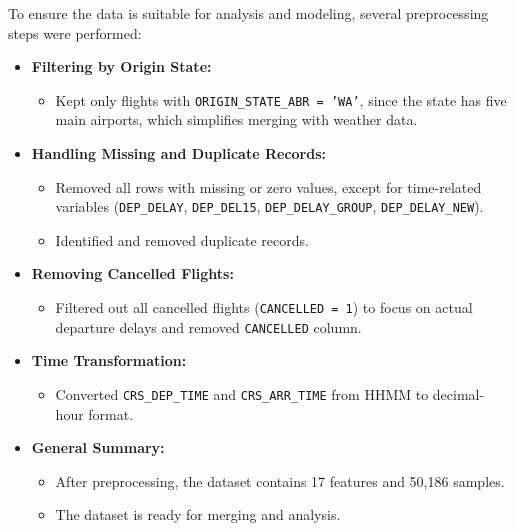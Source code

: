 \documentclass[a4paper,12pt]{report}
\begin{document}
To ensure the data is suitable for analysis and modeling, several preprocessing steps were performed:

\begin{itemize}
    \item \textbf{Filtering by Origin State:}
    \begin{itemize}
        \item Kept only flights with \texttt{ORIGIN\_STATE\_ABR = 'WA'}, since the state has five main airports, which simplifies merging with weather data.
    \end{itemize}

    \item \textbf{Handling Missing and Duplicate Records:}
    \begin{itemize}
        \item Removed all rows with missing or zero values, except for time-related variables (\texttt{DEP\_DELAY}, \texttt{DEP\_DEL15}, \texttt{DEP\_DELAY\_GROUP}, \texttt{DEP\_DELAY\_NEW}).
        \item Identified and removed duplicate records.
    \end{itemize}

    \item \textbf{Removing Cancelled Flights:}
    \begin{itemize}
        \item Filtered out all cancelled flights (\texttt{CANCELLED = 1}) to focus on actual departure delays and removed \texttt{CANCELLED} column.
    \end{itemize}

    \item \textbf{Time Transformation:}
    \begin{itemize}
        \item Converted \texttt{CRS\_DEP\_TIME} and \texttt{CRS\_ARR\_TIME} from HHMM to decimal-hour format.
    \end{itemize}

    \item \textbf{General Summary:}
    \begin{itemize}
        \item After preprocessing, the dataset contains 17 features and 50,186 samples.
        \item The dataset is ready for merging and analysis.
    \end{itemize}
\end{itemize}
\end{document}
